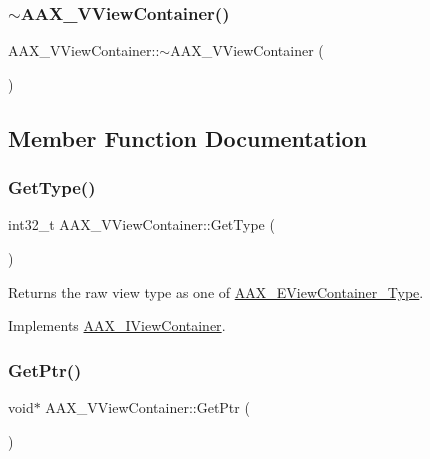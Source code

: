 \mbox{\label{a01945_a5b4e7392fa1cb28912bf6e5456984cc0}} 
\subsubsection{\texorpdfstring{$\sim$AAX\_VViewContainer()}{~AAX\_VViewContainer()}}
{\footnotesize\ttfamily A\+A\+X\+\_\+\+V\+View\+Container\+::$\sim$\+A\+A\+X\+\_\+\+V\+View\+Container (\begin{DoxyParamCaption}{ }\end{DoxyParamCaption})}



\subsection{Member Function Documentation}
\mbox{\label{a01945_a2d1b4bc3d5ff813a4761fd0200073be7}} 
\subsubsection{\texorpdfstring{GetType()}{GetType()}}
{\footnotesize\ttfamily int32\+\_\+t A\+A\+X\+\_\+\+V\+View\+Container\+::\+Get\+Type (\begin{DoxyParamCaption}{ }\end{DoxyParamCaption})\hspace{0.3cm}{\ttfamily [virtual]}}



Returns the raw view type as one of \mbox{\hyperlink{a00503_ab4c36de253fc80b541eb51074c64caef}{A\+A\+X\+\_\+\+E\+View\+Container\+\_\+\+Type}}. 



Implements \mbox{\hyperlink{a01889_a1715c042ed8412a2135f4d9e5109e8fb}{A\+A\+X\+\_\+\+I\+View\+Container}}.

\mbox{\label{a01945_a8cb4bb50d773b0f37ad38ca8d2bb3ada}} 
\subsubsection{\texorpdfstring{GetPtr()}{GetPtr()}}
{\footnotesize\ttfamily void$\ast$ A\+A\+X\+\_\+\+V\+View\+Container\+::\+Get\+Ptr (\begin{DoxyParamCaption}{ }\end{DoxyParamCaption})\hspace{0.3cm}{\ttfamily [virtual]}}



